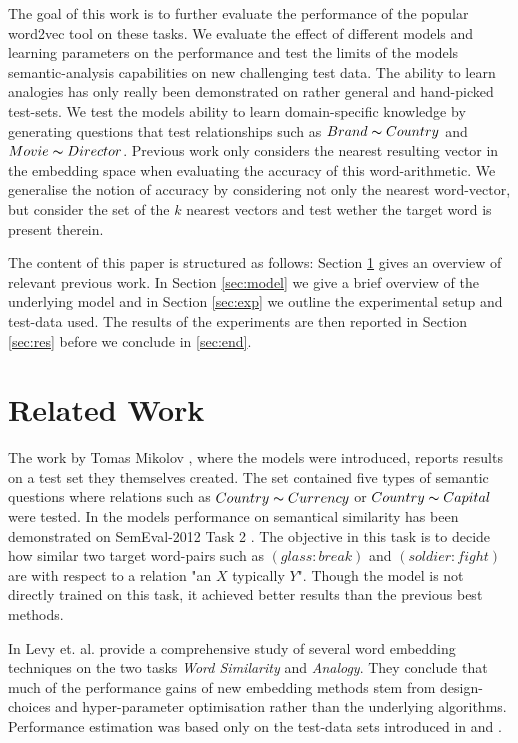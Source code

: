 \documentclass[conference]{IEEEtran}
\begin{document}
The goal of this work is to further evaluate the performance
of the popular word2vec tool on these tasks. We evaluate the effect of
different models and learning parameters on the performance and test
the limits of the models semantic-analysis capabilities on new challenging test data. 
The ability to learn analogies has only really been demonstrated on rather general and 
hand-picked test-sets. We test the models ability to learn domain-specific knowledge by 
generating questions that test relationships such as $Brand \thicksim Country$ 
and $Movie \thicksim Director$. Previous work only considers the nearest 
resulting vector in the embedding space when evaluating the accuracy of this word-arithmetic. 
We generalise the notion of accuracy by considering not only the nearest word-vector, but 
consider the set of the $k$ nearest vectors and test wether the target word is present therein. 


The content of this paper is structured as follows: Section \ref{sec:relwork} gives an overview 
of relevant previous work. In Section \ref{sec:model} we give a brief overview of the underlying 
model and in Section \ref{sec:exp} we outline the experimental setup and test-data used. 
The results of the experiments are then reported in Section \ref{sec:res} before we conclude
in \ref{sec:end}.


\section{Related Work}
\label{sec:relwork}

The work by Tomas Mikolov \cite{mikolov2013efficient}, where the models were introduced,
reports results on a test set they themselves created. The set contained five types of semantic
questions where relations such as $Country \thicksim Currency$ or $Country \thicksim Capital$
were tested. In \cite{mikolov2013linguistic} the models performance on semantical
similarity has been demonstrated on SemEval-2012 Task 2 \cite{jurgens2012semeval}.
The objective in this task is to decide how similar two target word-pairs such as
$(glass:break)$ and $(soldier:fight)$ are with respect to a relation "an $X$ typically $Y$". 
Though the model is not directly trained on this task, it achieved better results than  the previous
best methods. 

In \cite{levy2015improving} Levy et. al. provide a comprehensive study of several word 
embedding techniques on the two tasks \textit{Word Similarity} and \textit{Analogy}. 
They conclude that much of the performance gains of new embedding
methods stem from design-choices and hyper-parameter optimisation rather than the 
underlying algorithms. Performance estimation was based only on the test-data sets 
introduced in \cite{mikolov2013efficient} and \cite{mikolov2013linguistic}.
\end{document}
